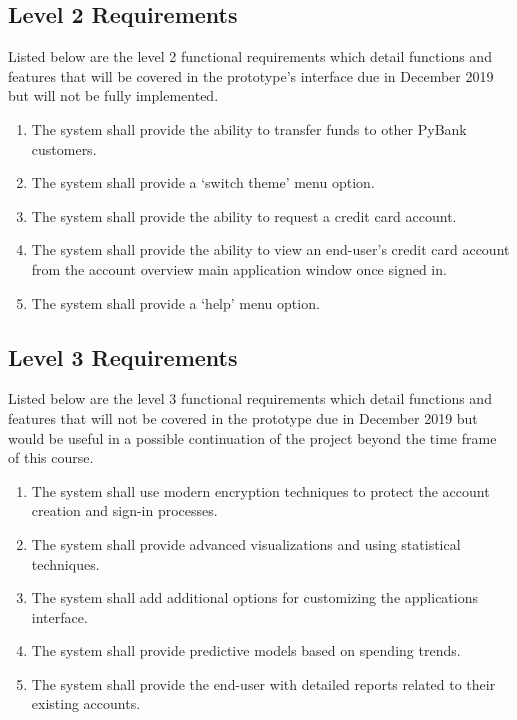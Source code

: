 \newpage

\subsection{Level 2 Requirements}
\label{sect:level_2_requirements}

Listed below are the level 2 functional requirements which detail functions and features that will be covered in the prototype's interface due in December 2019 but will not be fully implemented.

\begin{enumerate}[itemsep=1mm, parsep=0pt]
    \item {The system shall provide the ability to transfer funds to other PyBank customers.}
    \item {The system shall provide a `switch theme' menu option.}
    \item {The system shall provide the ability to request a credit card account.}
    \item {The system shall provide the ability to view an end-user's credit card account from the account overview main application window once signed in.}
    \item {The system shall provide a `help' menu option.}
\end{enumerate}

\subsection{Level 3 Requirements}
\label{sect:level_3_requirements}

Listed below are the level 3 functional requirements which detail functions and features that will not be covered in the prototype due in December 2019 but would be useful in a possible continuation of the project beyond the time frame of this course.

\begin{enumerate}[itemsep=1mm, parsep=0pt]
    \item {The system shall use modern encryption techniques to protect the account creation and sign-in processes.}
    \item {The system shall provide advanced visualizations and using statistical techniques.}
    \item {The system shall add additional options for customizing the applications interface.}
    \item {The system shall provide predictive models based on spending trends.}
    \item {The system shall provide the end-user with detailed reports related to their existing accounts.}
\end{enumerate}

